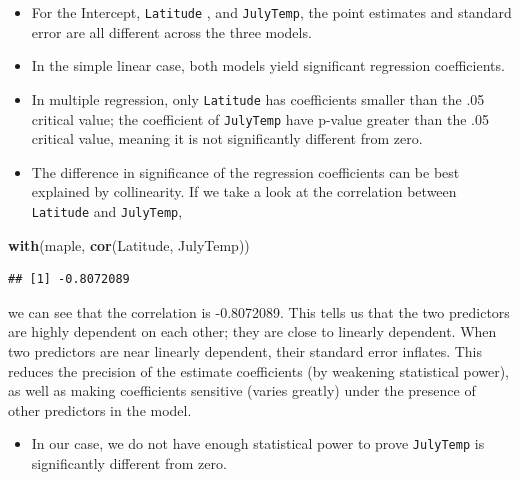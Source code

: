 \documentclass[]{article}
\newenvironment{Shaded}{\begin{snugshade}}{\end{snugshade}}
\newcommand{\KeywordTok}[1]{\textcolor[rgb]{0.13,0.29,0.53}{\textbf{#1}}}
\newcommand{\NormalTok}[1]{#1}
\providecommand{\tightlist}{%
  \setlength{\itemsep}{0pt}\setlength{\parskip}{0pt}}
\begin{document}
\begin{itemize}
\tightlist
\item
  For the Intercept, \texttt{Latitude} , and \texttt{JulyTemp}, the
  point estimates and standard error are all different across the three
  models.
\item
  In the simple linear case, both models yield significant regression
  coefficients.
\item
  In multiple regression, only \texttt{Latitude} has coefficients
  smaller than the .05 critical value; the coefficient of
  \texttt{JulyTemp} have p-value greater than the .05 critical value,
  meaning it is not significantly different from zero.
\item
  The difference in significance of the regression coefficients can be
  best explained by collinearity. If we take a look at the correlation
  between \texttt{Latitude} and \texttt{JulyTemp},
\end{itemize}

\begin{Shaded}
\begin{Highlighting}[]
\KeywordTok{with}\NormalTok{(maple, }\KeywordTok{cor}\NormalTok{(Latitude, JulyTemp))}
\end{Highlighting}
\end{Shaded}

\begin{verbatim}
## [1] -0.8072089
\end{verbatim}

we can see that the correlation is -0.8072089. This tells us that the
two predictors are highly dependent on each other; they are close to
linearly dependent. When two predictors are near linearly dependent,
their standard error inflates. This reduces the precision of the
estimate coefficients (by weakening statistical power), as well as
making coefficients sensitive (varies greatly) under the presence of
other predictors in the model.

\begin{itemize}
\tightlist
\item
  In our case, we do not have enough statistical power to prove
  \texttt{JulyTemp} is significantly different from zero. 
\end{itemize}
\end{document}
